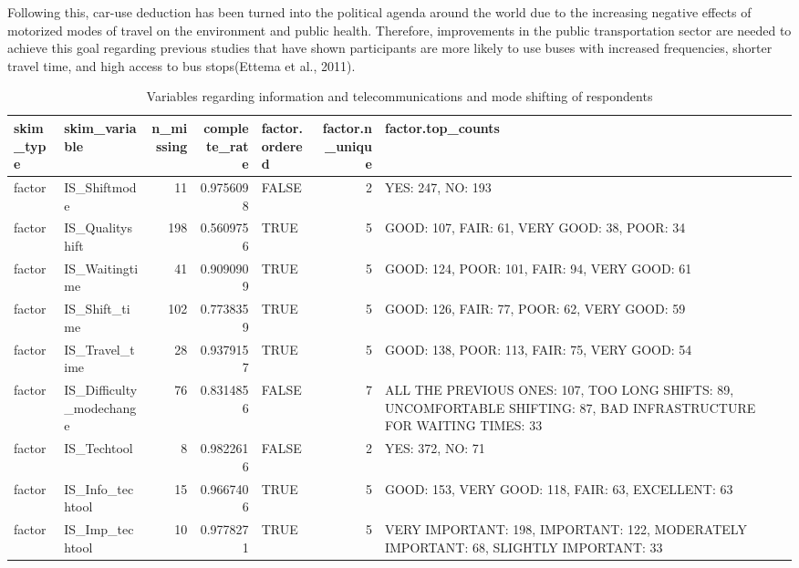 \documentclass[
11pt, %
oneside, %
english, %
singlespacing, %
]{macthesis} %
\newcommand{\blandscape}{\begin{landscape}}
\newcommand{\elandscape}{\end{landscape}}
\begin{document}
Following this, car-use deduction has been turned into the political agenda around the world due to the increasing negative effects of motorized modes of travel on the environment and public health. Therefore, improvements in the public transportation sector are needed to achieve this goal regarding previous studies that have shown participants are more likely to use buses with increased frequencies, shorter travel time, and high access to bus stops(Ettema et al., 2011).

\newpage
\blandscape
\begin{table}

\caption{\label{tab:unnamed-chunk-14}\label{tab:ITC-Shifting-Descriptives}Variables regarding information and telecommunications and mode shifting of respondents}
\centering
\fontsize{7}{9}\selectfont
\begin{tabular}[t]{llrrlr>{\raggedright\arraybackslash}p{10em}}
\toprule
skim\_type & skim\_variable & n\_missing & complete\_rate & factor.ordered & factor.n\_unique & factor.top\_counts\\
\midrule
factor & IS\_Shiftmode & 11 & 0.9756098 & FALSE & 2 & YES: 247, NO: 193\\
factor & IS\_Qualityshift & 198 & 0.5609756 & TRUE & 5 & GOOD: 107, FAIR: 61, VERY GOOD: 38, POOR: 34\\
factor & IS\_Waitingtime & 41 & 0.9090909 & TRUE & 5 & GOOD: 124, POOR: 101, FAIR: 94, VERY GOOD: 61\\
factor & IS\_Shift\_time & 102 & 0.7738359 & TRUE & 5 & GOOD: 126, FAIR: 77, POOR: 62, VERY GOOD: 59\\
factor & IS\_Travel\_time & 28 & 0.9379157 & TRUE & 5 & GOOD: 138, POOR: 113, FAIR: 75, VERY GOOD: 54\\
\addlinespace
factor & IS\_Difficulty\_modechange & 76 & 0.8314856 & FALSE & 7 & ALL THE PREVIOUS ONES: 107, TOO LONG SHIFTS: 89, UNCOMFORTABLE SHIFTING: 87, BAD INFRASTRUCTURE FOR WAITING TIMES: 33\\
factor & IS\_Techtool & 8 & 0.9822616 & FALSE & 2 & YES: 372, NO: 71\\
factor & IS\_Info\_techtool & 15 & 0.9667406 & TRUE & 5 & GOOD: 153, VERY GOOD: 118, FAIR: 63, EXCELLENT: 63\\
factor & IS\_Imp\_techtool & 10 & 0.9778271 & TRUE & 5 & VERY IMPORTANT: 198, IMPORTANT: 122, MODERATELY IMPORTANT: 68, SLIGHTLY IMPORTANT: 33\\
\bottomrule
\end{tabular}
\end{table}
\elandscape
\newpage
\end{document}
